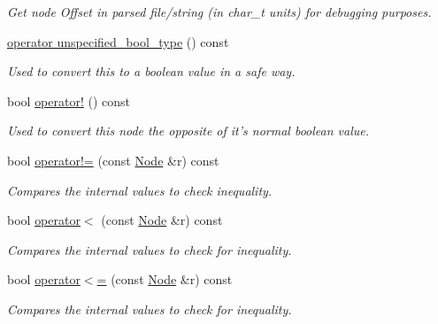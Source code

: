 \begin{DoxyCompactItemize}
\begin{DoxyCompactList}\small\item\em Get node Offset in parsed file/string (in char\_\-t units) for debugging purposes. \item\end{DoxyCompactList}\item 
\hyperlink{classMezzanine_1_1xml_1_1Node_a61a93d005bbf38ddeedb557bd05362ea}{operator unspecified\_\-bool\_\-type} () const 
\begin{DoxyCompactList}\small\item\em Used to convert this to a boolean value in a safe way. \item\end{DoxyCompactList}\item 
bool \hyperlink{classMezzanine_1_1xml_1_1Node_a9c668d6bcbc03f2d317373b28afde5df}{operator!} () const 
\begin{DoxyCompactList}\small\item\em Used to convert this node the opposite of it's normal boolean value. \item\end{DoxyCompactList}\item 
bool \hyperlink{classMezzanine_1_1xml_1_1Node_a67745da5a2906b374e91852a3ff20797}{operator!=} (const \hyperlink{classMezzanine_1_1xml_1_1Node}{Node} \&r) const 
\begin{DoxyCompactList}\small\item\em Compares the internal values to check inequality. \item\end{DoxyCompactList}\item 
bool \hyperlink{classMezzanine_1_1xml_1_1Node_ab4271159148ab31e96ceba83eee7e7a4}{operator$<$} (const \hyperlink{classMezzanine_1_1xml_1_1Node}{Node} \&r) const 
\begin{DoxyCompactList}\small\item\em Compares the internal values to check for inequality. \item\end{DoxyCompactList}\item 
bool \hyperlink{classMezzanine_1_1xml_1_1Node_a0a3a82560a9771ca5550719e9b3434aa}{operator$<$=} (const \hyperlink{classMezzanine_1_1xml_1_1Node}{Node} \&r) const 
\begin{DoxyCompactList}\small\item\em Compares the internal values to check for inequality. \item\end{DoxyCompactList}\item 

\end{DoxyCompactItemize}
